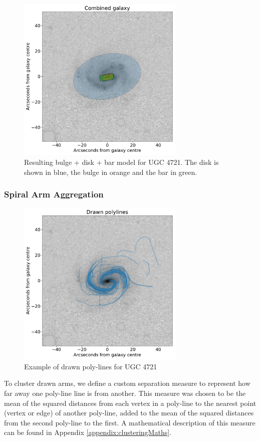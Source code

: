 \documentclass[../main.tex]{subfiles}
\begin{document}
\begin{figure}
  \includegraphics[width=8cm]{images__results/clustered_shapes.pdf}
  \caption{Resulting bulge + disk + bar model for UGC 4721. The disk is shown in blue, the bulge in orange and the bar in green.}
  \label{fig:clustered_shapes}
\end{figure}


\subsubsection{Spiral Arm Aggregation}
\begin{figure}
  \includegraphics[width=8cm]{images__results/drawn_polylines.pdf}
  \caption{Example of drawn poly-lines for UGC 4721}
  \label{fig:drawn_polylines}
\end{figure}

To cluster drawn arms, we define a custom separation measure to represent how far away one poly-line line is from another. This measure was chosen to be the mean of the squared distances from each vertex in a poly-line to the nearest point (vertex or edge) of another poly-line, added to the mean of the squared distances from the second poly-line to the first. A mathematical description of this measure can be found in Appendix \ref{appendix:clusteringMaths}.
\end{document}
